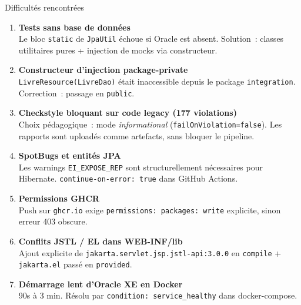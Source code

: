 \documentclass[aspectratio=169,12pt]{beamer}
\begin{document}
\begin{frame}{Difficultés rencontrées}
  \begin{enumerate}
    \item \textbf{Tests sans base de données}\\
          Le bloc \texttt{static} de \texttt{JpaUtil} échoue si Oracle est absent.
          Solution~: classes utilitaires pures + injection de mocks via constructeur.

    \vspace{0.3em}
    \item \textbf{Constructeur d'injection package-private}\\
          \texttt{LivreResource(LivreDao)} était inaccessible depuis le package
          \texttt{integration}. Correction~: passage en \texttt{public}.

    \vspace{0.3em}
    \item \textbf{Checkstyle bloquant sur code legacy (177 violations)}\\
          Choix pédagogique~: mode \emph{informational}
          (\texttt{failOnViolation=false}). Les rapports sont uploadés comme
          artefacts, sans bloquer le pipeline.

    \vspace{0.3em}
    \item \textbf{SpotBugs et entités JPA}\\
          Les warnings \texttt{EI\_EXPOSE\_REP} sont structurellement nécessaires
          pour Hibernate. \texttt{continue-on-error: true} dans GitHub Actions.

    \vspace{0.3em}
    \item \textbf{Permissions GHCR}\\
          Push sur \texttt{ghcr.io} exige \texttt{permissions: packages: write}
          explicite, sinon erreur 403 obscure.

    \vspace{0.3em}
    \item \textbf{Conflits JSTL / EL dans WEB-INF/lib}\\
          Ajout explicite de \texttt{jakarta.servlet.jsp.jstl-api:3.0.0} en
          \texttt{compile} + \texttt{jakarta.el} passé en \texttt{provided}.

    \vspace{0.3em}
    \item \textbf{Démarrage lent d'Oracle XE en Docker}\\
          90s à 3 min. Résolu par \texttt{condition: service\_healthy} dans
          docker-compose.
  \end{enumerate}
\end{frame}
\end{document}
